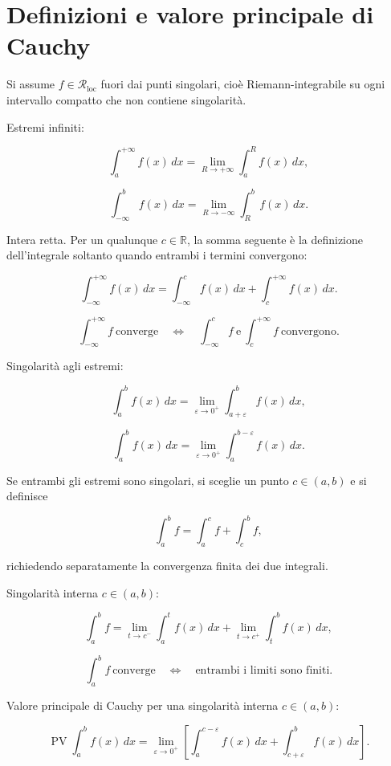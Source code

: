 \section{Definizioni e valore principale di Cauchy}\label{definizioni-e-valore-principale-di-cauchy}

Si assume \(f\in\mathcal R_{\mathrm{loc}}\) fuori dai punti singolari, cioè Riemann-integrabile su ogni intervallo compatto che non contiene singolarità.

Estremi infiniti:

\[
\displaystyle
\int_a^{+\infty}f(x)\,dx
=
\lim_{R\to+\infty}\int_a^R f(x)\,dx,
\]

\[
\displaystyle
\int_{-\infty}^{b}f(x)\,dx
=
\lim_{R\to-\infty}\int_R^b f(x)\,dx.
\]

Intera retta. Per un qualunque \(c\in\mathbb R\), la somma seguente è la definizione dell'integrale soltanto quando entrambi i termini convergono:

\[
\displaystyle
\int_{-\infty}^{+\infty}f(x)\,dx
=
\int_{-\infty}^{c}f(x)\,dx
+
\int_c^{+\infty}f(x)\,dx.
\]

\[
\displaystyle
\int_{-\infty}^{+\infty}f\ \text{converge}
\quad\Longleftrightarrow\quad
\int_{-\infty}^{c}f\ \text{e}\ \int_c^{+\infty}f\ \text{convergono}.
\]

Singolarità agli estremi:

\[
\displaystyle
\int_a^b f(x)\,dx
=
\lim_{\varepsilon\to0^+}
\int_{a+\varepsilon}^{b}f(x)\,dx,
\]

\[
\displaystyle
\int_a^b f(x)\,dx
=
\lim_{\varepsilon\to0^+}
\int_a^{b-\varepsilon}f(x)\,dx.
\]

Se entrambi gli estremi sono singolari, si sceglie un punto \(c\in(a,b)\) e si definisce

\[
\int_a^b f
=
\int_a^c f+\int_c^b f,
\]

richiedendo separatamente la convergenza finita dei due integrali.

Singolarità interna \(c\in(a,b)\):

\[
\displaystyle
\int_a^b f
=
\lim_{t\to c^-}\int_a^t f(x)\,dx
+
\lim_{t\to c^+}\int_t^b f(x)\,dx,
\]

\[
\displaystyle
\int_a^b f\ \text{converge}
\quad\Longleftrightarrow\quad
\text{entrambi i limiti sono finiti}.
\]

Valore principale di Cauchy per una singolarità interna \(c\in(a,b)\):

\[
\displaystyle
\operatorname{PV}\int_a^b f(x)\,dx
=
\lim_{\varepsilon\to0^+}
\left[
\int_a^{c-\varepsilon}f(x)\,dx
+
\int_{c+\varepsilon}^{b}f(x)\,dx
\right].
\]

